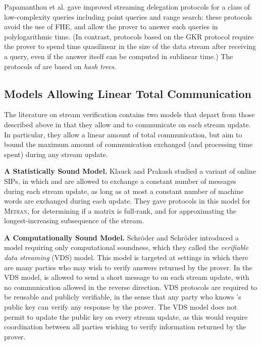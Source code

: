 \documentclass[11pt, letterpaper]{article}
\begin{document}
 Papamanthou et al. \cite{eurocryptpaper} gave
improved streaming delegation protocols for a class of low-complexity queries including point queries and range search: these
protocols avoid the use of FHE, and allow the prover to answer such queries in polylogarithmic time. 
(In contrast, protocols based on the GKR protocol \cite{chung, vldb} require the prover to spend time 
quasilinear in the size of the data stream after receiving
a query, even if the answer itself can be computed in sublinear time.) The protocols of \cite{eurocryptpaper} are based on \emph{hash trees}.


\subsection{Models Allowing Linear Total Communication}
\label{sec:perupdate}
The literature on stream verification contains two models that depart from those described above in that they allow  and  to communicate on each stream update. In particular, they allow a linear amount of total communication, but aim to bound the maximum amount of communication exchanged (and processing time spent) during any stream update.

\medskip
\noindent \textbf{A Statistically Sound Model.} 
Klauck and Prakash \cite{prakash} studied a variant of online SIPs, in which  and  are allowed to exchange a constant number of messages during each stream update, as long as at most a constant number of machine words are exchanged during each update. They gave protocols in this model for \textsc{Median}, for determining if a matrix is full-rank, and for approximating the longest-increasing subsequence of the stream.

\medskip
\noindent \textbf{A Computationally Sound Model.} Schr{\"o}der and Schr{\"o}der \cite{ccs} introduced a model requiring only computational soundness, which they called the \emph{verifiable data streaming} (VDS) model. This model is targeted at settings in which there are many parties who may wish to verify answers returned by the prover. In the VDS model,  is allowed to send a short message to  on each stream update, with no communication allowed in the reverse direction. VDS protocols are required to be reusable and publicly verifiable, in the sense that any party who knows 's public key can verify any response by the prover. The VDS model does not permit  to update the public key on every stream update, as this would require coordination between all parties wishing to verify information returned by the prover. 
\end{document}
